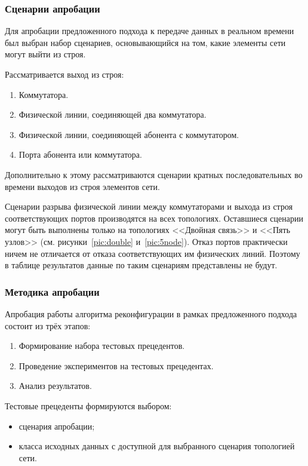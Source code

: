 \documentclass[12pt, a4paper]{article}
\begin{document}
\subsubsection{Сценарии апробации}

Для апробации предложенного подхода к передаче данных в реальном времени был выбран набор сценариев, основывающийся на том, какие элементы сети могут выйти из строя. 

Рассматривается выход из строя:
\begin{enumerate}
	\item Коммутатора.
	\item Физической линии, соединяющей два коммутатора.
	\item Физической линии, соединяющей абонента с коммутатором.
	\item Порта абонента или коммутатора.
\end{enumerate}

Дополнительно к этому рассматриваются сценарии кратных последовательных во времени выходов из строя элементов сети.

Сценарии разрыва физической линии между коммутаторами и выхода из строя соответствующих портов производятся на всех топологиях. Оставшиеся сценарии могут быть выполнены только на топологиях <<Двойная связь>> и <<Пять узлов>> (см. рисунки~\ref{pic:double} и~\ref{pic:5node}). Отказ портов практически ничем не отличается от отказа соответствующих им физических линий. Поэтому в таблице результатов данные по таким сценариям представлены не будут.

\subsubsection{Методика апробации}
Апробация работы алгоритма реконфигурации в рамках предложенного подхода состоит из трёх этапов:
\begin{enumerate}
	\item Формирование набора тестовых прецедентов.
	\item Проведение экспериментов на тестовых прецедентах.
	\item Анализ результатов.
\end{enumerate}

Тестовые прецеденты формируются выбором:
\begin{itemize}
	\item сценария апробации;
	\item класса исходных данных с доступной для выбранного сценария топологией сети.
\end{itemize}
\end{document}
